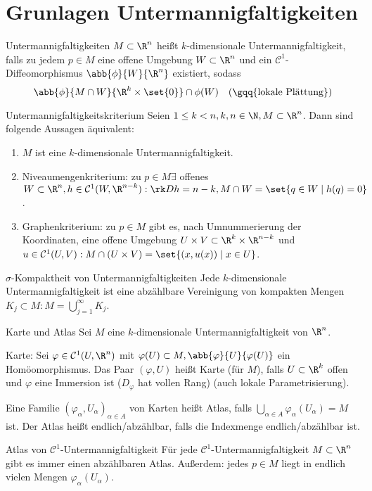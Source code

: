 \section*{Grunlagen Untermannigfaltigkeiten}

\begin{karte}{Untermannigfaltigkeiten}
    \(M\subset \R^n\) heißt \(k\)-dimensionale Untermannigfaltigkeit, 
    falls zu jedem \(p \in M\) eine offene Umgebung \(W \subset \R^n\) und 
    ein \( \mathcal{C}^1 \)-Diffeomorphismus \( \abb{\phi}{W}{\R^n} \) existiert, sodass 
    \[ \abb{\phi}{M\cap W}{\R^k \times \set{0}} \cap \phi(W) \quad \text{(\gqq{lokale Plättung})} \]
\end{karte}

\begin{karte}{Untermannigfaltigkeitskriterium}
    Seien \( 1\leq k < n, k,n\in\N, M \subset \R^n \). Dann sind folgende Aussagen 
    äquivalent:
    \begin{enumerate}
        \item \(M\) ist eine \(k\)-dimensionale Untermannigfaltigkeit.
        \item Niveaumengenkriterium: zu \(p\in M \exists \) offenes \(W\subset \R^n, 
        h \in \mathcal{C}^1(W, \R^{n-k}): \rk Dh = n-k, M\cap W = \set{q\in W \;|\; h(q) = 0} \).
        \item Graphenkriterium: zu \(p\in M\) gibt es, nach Umnummerierung der 
        Koordinaten, eine offene Umgebung \( U \times V \subset \R^k \times \R^{n- k} \)
        und \( u\in \mathcal{C}^1(U,V): M\cap (U\times V) = \set{(x,u(x)) \;|\; x\in U} \).
    \end{enumerate}
\end{karte}

\begin{karte}{\(\sigma\)-Kompaktheit von Untermannigfaltigkeiten}
    Jede \(k\)-dimensionale Untermannigfaltigkeit ist eine abzählbare 
    Vereinigung von kompakten Mengen \( K_j \subset M: M = \bigcup_{j=1}^\infty K_j \).
\end{karte}

\begin{karte}{Karte und Atlas}
    Sei \( M \) eine \(k\)-dimensionale Untermannigfaltigkeit von \(\R^n\). 
    
    Karte: Sei \( \varphi \in \mathcal{C}^1(U, \R^n) \) mit \( \varphi(U) \subset M, 
    \abb{\varphi}{U}{\varphi(U)} \) ein Homöomorphismus.
    Das Paar \( (\varphi, U) \) heißt Karte (für \(M\)), falls \( U \subset \R^k \) offen und
    \( \varphi \) eine Immersion ist (\(D_\varphi\) hat vollen Rang) (auch lokale Parametrisierung).

    Eine Familie \( (\varphi_\alpha, U_\alpha)_{\alpha\in A} \) von Karten 
    heißt Atlas, falls \( \bigcup_{\alpha \in A} \varphi_\alpha(U_\alpha) = M \) ist. 
    Der Atlas heißt endlich/abzählbar, falls die Indexmenge endlich/abzählbar ist.
\end{karte}

\begin{karte}{Atlas von \(\mathcal{C}^1\)-Untermannigfaltigkeit}
    Für jede \( \mathcal{C}^1 \)-Untermannigfaltigkeit \(M\subset \R^n\) gibt es 
    immer einen abzählbaren Atlas. 
    Außerdem: jedes \( p\in M \) liegt in endlich vielen Mengen \( \varphi_\alpha(U_\alpha) \).
\end{karte}